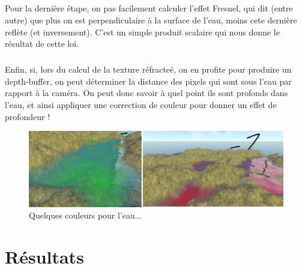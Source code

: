 \documentclass{EPUProjetDi}
\begin{document}
\paragraph{}
Pour la dernière étape, on pas facilement calculer l'effet Fresnel, qui dit (entre autre) que plus on est perpendiculaire à la surface de l'eau, moins cete dernière reflète (et inversement).
C'est un simple produit scalaire qui nous donne le résultat de cette loi.
\paragraph{}
Enfin, si, lors du calcul de la texture réfracteé, on en profite pour produire un depth-buffer, on peut déterminer la distance des pixels qui sont sous l'eau par rapport à la caméra. On peut donc savoir à quel point ils sont profonds dans l'eau, et ainsi appliquer
une correction de couleur pour donner un effet de profondeur !


\begin{figure}[h]
	\centering
	\includegraphics[scale=.5]{water_colors}
	\caption{Quelques couleurs pour l'eau...}
	\label{fig:water_colors}
\end{figure}



\chapter{Résultats}
\end{document}
